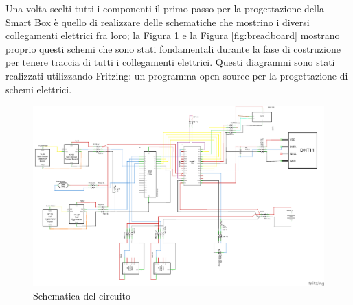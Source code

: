 \documentclass[fleqn, 10pt]{SelfArx}
\begin{document}
Una volta scelti tutti i componenti il primo passo per la progettazione della Smart Box è quello di realizzare delle schematiche che mostrino i diversi collegamenti elettrici fra loro; la Figura \ref{fig:schematics} 
e la Figura \ref{fig:breadboard} mostrano proprio questi schemi che sono stati fondamentali durante la fase di costruzione per tenere traccia di tutti i collegamenti elettrici. Questi diagrammi sono stati realizzati 
utilizzando Fritzing\cite{fritzing}: un programma open source per la progettazione di schemi elettrici.

\begin{figure}[htb]
\centering
\includegraphics[scale=0.25]{hardware/iot_project_schem.png}
\caption{Schematica del circuito}
\label{fig:schematics}
\end{figure}
\end{document}
